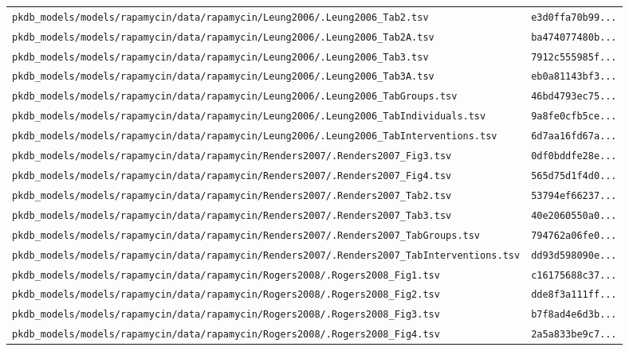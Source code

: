 \documentclass{article}
\begin{document}
\begin{longtable}{ll}
\texttt{pkdb\_models/models/rapamycin/data/rapamycin/Leung2006/.Leung2006\_Tab2.tsv} & \texttt{e3d0ffa70b99...} \\
\texttt{pkdb\_models/models/rapamycin/data/rapamycin/Leung2006/.Leung2006\_Tab2A.tsv} & \texttt{ba474077480b...} \\
\texttt{pkdb\_models/models/rapamycin/data/rapamycin/Leung2006/.Leung2006\_Tab3.tsv} & \texttt{7912c555985f...} \\
\texttt{pkdb\_models/models/rapamycin/data/rapamycin/Leung2006/.Leung2006\_Tab3A.tsv} & \texttt{eb0a81143bf3...} \\
\texttt{pkdb\_models/models/rapamycin/data/rapamycin/Leung2006/.Leung2006\_TabGroups.tsv} & \texttt{46bd4793ec75...} \\
\texttt{pkdb\_models/models/rapamycin/data/rapamycin/Leung2006/.Leung2006\_TabIndividuals.tsv} & \texttt{9a8fe0cfb5ce...} \\
\texttt{pkdb\_models/models/rapamycin/data/rapamycin/Leung2006/.Leung2006\_TabInterventions.tsv} & \texttt{6d7aa16fd67a...} \\
\texttt{pkdb\_models/models/rapamycin/data/rapamycin/Renders2007/.Renders2007\_Fig3.tsv} & \texttt{0df0bddfe28e...} \\
\texttt{pkdb\_models/models/rapamycin/data/rapamycin/Renders2007/.Renders2007\_Fig4.tsv} & \texttt{565d75d1f4d0...} \\
\texttt{pkdb\_models/models/rapamycin/data/rapamycin/Renders2007/.Renders2007\_Tab2.tsv} & \texttt{53794ef66237...} \\
\texttt{pkdb\_models/models/rapamycin/data/rapamycin/Renders2007/.Renders2007\_Tab3.tsv} & \texttt{40e2060550a0...} \\
\texttt{pkdb\_models/models/rapamycin/data/rapamycin/Renders2007/.Renders2007\_TabGroups.tsv} & \texttt{794762a06fe0...} \\
\texttt{pkdb\_models/models/rapamycin/data/rapamycin/Renders2007/.Renders2007\_TabInterventions.tsv} & \texttt{dd93d598090e...} \\
\texttt{pkdb\_models/models/rapamycin/data/rapamycin/Rogers2008/.Rogers2008\_Fig1.tsv} & \texttt{c16175688c37...} \\
\texttt{pkdb\_models/models/rapamycin/data/rapamycin/Rogers2008/.Rogers2008\_Fig2.tsv} & \texttt{dde8f3a111ff...} \\
\texttt{pkdb\_models/models/rapamycin/data/rapamycin/Rogers2008/.Rogers2008\_Fig3.tsv} & \texttt{b7f8ad4e6d3b...} \\
\texttt{pkdb\_models/models/rapamycin/data/rapamycin/Rogers2008/.Rogers2008\_Fig4.tsv} & \texttt{2a5a833be9c7...} \\

\end{longtable}
\end{document}
